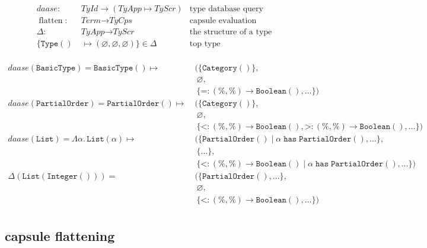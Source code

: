 \documentclass[10pt]{article}
\newcommand\Term{\textit{Term}}
\newcommand\TyId{\textit{TyId}}
\newcommand\TyApp{\textit{TyApp}}
\newcommand\TyCps{\textit{TyCps}}
\newcommand\TyScr{\textit{TyScr}}
\newcommand\Category{\texttt{Category}}
\newcommand\Thas{\mathrel{\texttt{has}}}
\newcommand\Mflatten{\mathop{flatten}}
\newcommand\Mif{\mathrel{|}}
\newcommand\Type{\texttt{Type}}
\newcommand\BasicType{\texttt{BasicType}}
\newcommand\PartialOrder{\texttt{PartialOrder}}
\newcommand\Integer{\texttt{Integer}}
\newcommand\Boolean{\texttt{Boolean}}
\newcommand\List{\texttt{List}}
\begin{document}
\begin{minipage}{\textwidth}
  \begin{align*}
    daase : &\ \TyId \rightarrow (\TyApp \mapsto \TyScr) &
      \text{type database query} \\
    \Mflatten : &\ \Term \rightarrow \TyCps &
      \text{capsule evaluation} \\
    \Delta : &\ \TyApp \rightarrow \TyScr &
      \text{the structure of a type}
    \\[0.5em]
    \{ \Type() &\; \mapsto(\varnothing, \varnothing, \varnothing) \} \in
      \Delta & \text{top type}\\
  \end{align*}

  \vspace{-2.0em}

  \begin{align*}
    daase(\BasicType) = \BasicType() \mapsto
      &\ ( \{ \Category() \}, \\
      &\ \ \varnothing, \\
      &\ \ \{ \texttt{=} : (\%,\%) \rightarrow \Boolean(), \ldots \})
    \\[0.5em]
    daase(\PartialOrder) = \PartialOrder() \mapsto
      &\ ( \{ \Category() \}, \\
      &\ \ \varnothing, \\
      &\ \ \{ \texttt{<} : (\%,\%) \rightarrow \Boolean(),
              \texttt{>} : (\%,\%) \rightarrow \Boolean(), \ldots \} )
    \\[0.5em]
    daase(\List) = \Lambda \alpha.\,\List(\alpha) \mapsto
      &\ ( \{\PartialOrder() \Mif \alpha \Thas \PartialOrder(), \ldots \}, \\
      &\ \ \{ \ldots \}, \\
      &\ \ \{ \texttt{<} : (\%,\%) \rightarrow \Boolean() \Mif \alpha \Thas
              \PartialOrder(), \ldots \} )
    \\[0.5em]
    \Delta(\List(\Integer())) = 
      &\ ( \{ \PartialOrder(), \ldots \}, \\
      &\ \ \varnothing, \\
      &\ \ \{ \texttt{<} : (\%,\%) \rightarrow \Boolean(), \ldots \} ) \\
  \end{align*}
\end{minipage}

\subsection*{capsule flattening}
\end{document}
